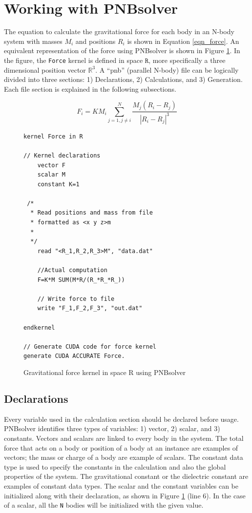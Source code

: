 \documentclass[draftclsnofoot]{elsarticle}
\begin{document}
   
\section{Working with PNBsolver}
\label{working}


The equation to calculate the gravitational force for each body in an N-body system with masses $M_i$ and positions $R_i$ is shown in Equation \ref{eqn_force}. 
An equivalent representation of the force using PNBsolver is shown in Figure \ref{fig_force}. In the figure, the \texttt{Force} kernel is defined in 
space $\texttt{R}$, more specifically a three dimensional position vector $\mathbb{R}^3$. A ``pnb'' (parallel N-body) file can be logically divided into three sections: 
1) Declarations, 2) Calculations, and 3) Generation. Each file section is explained in the following subsections. 

\begin{equation}
\label{eqn_force}
F_i =KM_i\sum\limits_{j=1, j\ne i}^{N} \frac{M_j(R_i-R_j)}{|R_i-R_j|^3}
\end{equation}

\begin{figure}[!t]
\centering
\begin{lstlisting}[style=AMMA, language=PNB]
kernel Force in R

// Kernel declarations
	vector F
	scalar M
	constant K=1
	
 /*
  * Read positions and mass from file
  * formatted as <x y z>m
  *
  */
	read "<R_1,R_2,R_3>M", "data.dat"

	//Actual computation
	F=K*M SUM(M*R/(R_*R_*R_))

	// Write force to file 
	write "F_1,F_2,F_3", "out.dat"
	
endkernel

// Generate CUDA code for force kernel
generate CUDA ACCURATE Force. 
\end{lstlisting}
\caption{Gravitational force kernel in space R using PNBsolver}
\label{fig_force}
\end{figure}

\subsection{Declarations}
Every variable used in the calculation section should be declared before usage.
PNBsolver identifies three types of variables: 1) vector, 2) scalar, and 3) constants. Vectors and scalars are linked to every body in the system. %
The total force that acts on a body or position of a body at an instance are examples of vectors; the mass or charge of a body are example of scalars. The constant data type
is used to specify the constants in the calculation and also the global properties of the system. 
The gravitational constant or the dielectric constant are 
examples of constant data types. The scalar and the constant variables  can be initialized along with their declaration, as shown in Figure \ref{fig_force} (line 6). In the case of a scalar,
all the \texttt{N} bodies will be initialized with the given value. 
\end{document}
